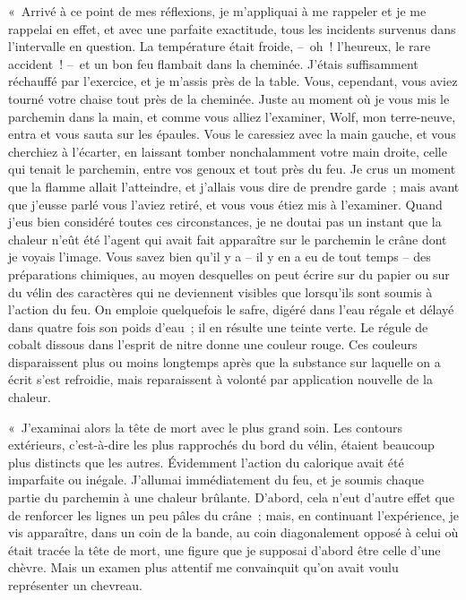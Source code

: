 \documentclass[french,twoside]{book} %
\begin{document}
« Arrivé à ce point de mes réflexions, je m’appliquai à me rappeler et je me rappelai en effet, et avec une parfaite exactitude, tous les incidents survenus dans l’intervalle en question. La température était froide, – oh ! l’heureux, le rare accident ! – et un bon feu flambait dans la cheminée. J’étais suffisamment réchauffé par l’exercice, et je m’assis près de la table. Vous, cependant, vous aviez tourné votre chaise tout près de la cheminée. Juste au moment où je vous mis le parchemin dans la main, et comme vous alliez l’examiner, Wolf, mon terre-neuve, entra et vous sauta sur les épaules. Vous le caressiez avec la main gauche, et vous cherchiez à l’écarter, en laissant tomber nonchalamment votre main droite, celle qui tenait le parchemin, entre vos genoux et tout près du feu. Je crus un moment que la flamme allait l’atteindre, et j’allais vous dire de prendre garde ; mais avant que j’eusse parlé vous l’aviez retiré, et vous vous étiez mis à l’examiner. Quand j’eus bien considéré toutes ces circonstances, je ne doutai pas un instant que la chaleur n’eût été l’agent qui avait fait apparaître sur le parchemin le crâne dont je voyais l’image. Vous savez bien qu’il y a – il y en a eu de tout temps – des préparations chimiques, au moyen desquelles on peut écrire sur du papier ou sur du vélin des caractères qui ne deviennent visibles que lorsqu’ils sont soumis à l’action du feu. On emploie quelquefois le safre, digéré dans l’eau régale et délayé dans quatre fois son poids d’eau ; il en résulte une teinte verte. Le régule de cobalt dissous dans l’esprit de nitre donne une couleur rouge. Ces couleurs disparaissent plus ou moins longtemps après que la substance sur laquelle on a écrit s’est refroidie, mais reparaissent à volonté par application nouvelle de la chaleur.\par
« J’examinai alors la tête de mort avec le plus grand soin. Les contours extérieurs, c’est-à-dire les plus rapprochés du bord du vélin, étaient beaucoup plus distincts que les autres. Évidemment l’action du calorique avait été imparfaite ou inégale. J’allumai immédiatement du feu, et je soumis chaque partie du parchemin à une chaleur brûlante. D’abord, cela n’eut d’autre effet que de renforcer les lignes un peu pâles du crâne ; mais, en continuant l’expérience, je vis apparaître, dans un coin de la bande, au coin diagonalement opposé à celui où était tracée la tête de mort, une figure que je supposai d’abord être celle d’une chèvre. Mais un examen plus attentif me convainquit qu’on avait voulu représenter un chevreau.\par
\end{document}

